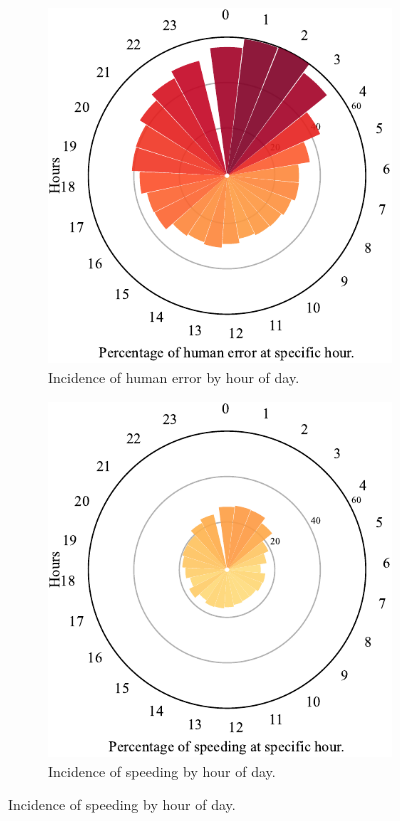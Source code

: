\documentclass{article}
\theoremstyle{plain}
\theoremstyle{definition}
\theoremstyle{remark}
\begin{document}
\begin{figure}[ht]
	\vskip 0.2in
	\centering
		\begin{subfigure}[ht]{0.45\columnwidth}
			\includegraphics[width=\columnwidth]{plots/err-time-total}
			\caption{Incidence of human error by hour of day.}
			\label{fig:err-time-overall}
		\end{subfigure}
		\hfill
		\begin{subfigure}[ht]{0.45\columnwidth}
			\includegraphics[width=\columnwidth]{plots/err-time-speeding}
			\caption{Incidence of speeding by hour of day.}
			\label{fig:err-time-speeding}
		\end{subfigure}


\end{figure}
\end{document}
